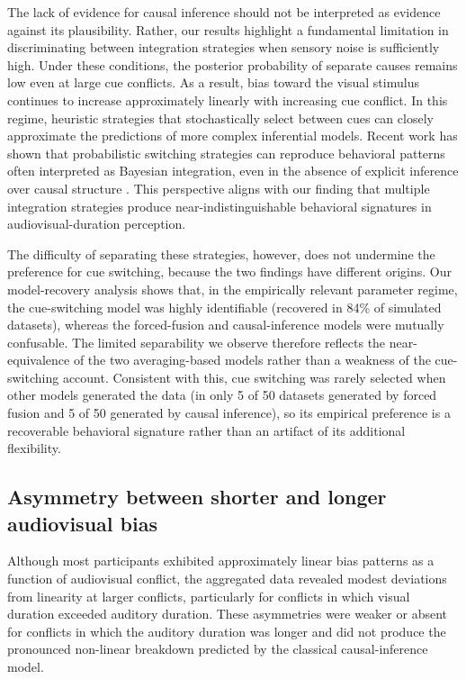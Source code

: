 \documentclass{biorxiv}
\providecommand{\citep}[1]{\cite{#1}}
\begin{document}
The lack of evidence for causal inference should not be interpreted as evidence against its plausibility. Rather, our results highlight a fundamental limitation in discriminating between integration strategies when sensory noise is sufficiently high. Under these conditions, the posterior probability of separate causes remains low even at large cue conflicts. As a result, bias toward the visual stimulus continues to increase approximately linearly with increasing cue conflict. In this regime, heuristic strategies that stochastically select between cues can closely approximate the predictions of more complex inferential models. Recent work has shown that probabilistic switching strategies can reproduce behavioral patterns often interpreted as Bayesian integration, even in the absence of explicit inference over causal structure \citep{ni2024computational}. This perspective aligns with our finding that multiple integration strategies produce near-indistinguishable behavioral signatures in audiovisual-duration perception.

The difficulty of separating these strategies, however, does not undermine the preference for cue switching, because the two findings have different origins. Our model-recovery analysis shows that, in the empirically relevant parameter regime, the cue-switching model was highly identifiable (recovered in 84\% of simulated datasets), whereas the forced-fusion and causal-inference models were mutually confusable. The limited separability we observe therefore reflects the near-equivalence of the two averaging-based models rather than a weakness of the cue-switching account. Consistent with this, cue switching was rarely selected when other models generated the data (in only 5 of 50 datasets generated by forced fusion and 5 of 50 generated by causal inference), so its empirical preference is a recoverable behavioral signature rather than an artifact of its additional flexibility.

\subsection{Asymmetry between shorter and longer audiovisual bias}

Although most participants exhibited approximately linear bias patterns as a function of audiovisual conflict, the aggregated data revealed modest deviations from linearity at larger conflicts, particularly for conflicts in which visual duration exceeded auditory duration. These asymmetries were weaker or absent for conflicts in which the auditory duration was longer and did not produce the pronounced non-linear breakdown predicted by the classical causal-inference model.
\end{document}
